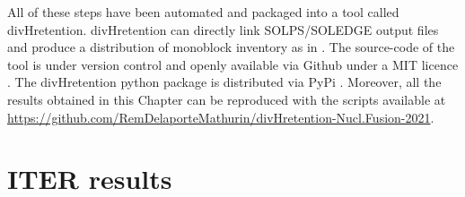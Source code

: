 All of these steps have been automated and packaged into a tool called divHretention.
divHretention can directly link SOLPS/SOLEDGE output files and produce a distribution of monoblock inventory as in .
The source-code of the tool is under version control and openly available via Github under a MIT licence \cite{delaporte-mathurin_irfmdivhretention_2021}.
The divHretention python package is distributed via PyPi \cite{delaporte-mathurin_divhretention_nodate}.
Moreover, all the results obtained in this Chapter can be reproduced with the scripts available at \href{https://github.com/RemDelaporteMathurin/divHretention-Nucl.Fusion-2021}{https://github.com/RemDelaporteMathurin/divHretention-Nucl.Fusion-2021}.

\section{ITER results}

